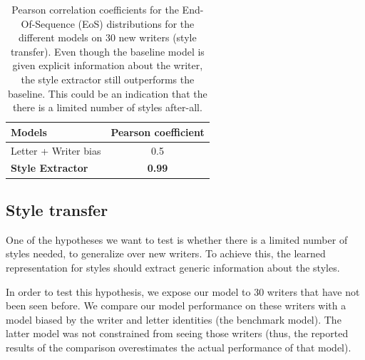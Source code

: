
  \begin{table}[!htbp]
  \centering
  \begin{tabular}{l|c}
  \hline
  Models & Pearson coefficient\\ \hline
  Letter + Writer bias & 0.5\\ \hline
  \textbf{Style Extractor} & \textbf{0.99}\\ \hline
  \end{tabular}
  \caption{Pearson correlation coefficients for the End-Of-Sequence (EoS) distributions for the different models on 30 new writers (style transfer). Even though the baseline model is given explicit information about the writer, the style extractor still outperforms the baseline. This could be an indication that the there is a limited number of styles after-all.}
  \label{table:EoS_transfer}
  \end{table}

  \subsection{Style transfer}
  \par One of the hypotheses we want to test is whether there is a limited number of styles needed, to generalize over new writers. To achieve this, the learned representation for styles should extract generic information about the styles.

  \par In order to test this hypothesis, we expose our model to 30 writers that have not been seen before. We compare our model performance on these writers with a model biased by the writer and letter identities (the benchmark model). The latter model was not constrained from seeing those writers (thus, the reported results of the comparison overestimates the actual performance of that model).

